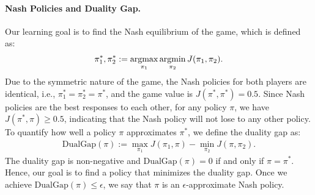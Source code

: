 \paragraph{Nash Policies and Duality Gap.} Our learning goal is to find the Nash equilibrium of the game, which is defined as:
\begin{align*}
\pi_1^*,\pi_2^*:=\mathop{\mathrm{argmax}}_{\pi_1} \mathop{\mathrm{argmin}}_{\pi_2} J(\pi_1,\pi_2).
\end{align*}
Due to the symmetric nature of the game, the Nash policies for both players are identical, i.e., $\pi_1^*=\pi_2^*=\pi^*$, and the game value is $J(\pi^*,\pi^*)=0.5$. Since Nash policies are the best responses to each other, for any policy $\pi$, we have $J(\pi^*,\pi) \ge 0.5$, indicating that the Nash policy will not lose to any other policy. To quantify how well a policy $\pi$ approximates $\pi^*$, we define the duality gap as:
\begin{align*}
\mathrm{DualGap}(\pi):=\max_{\pi_1} J(\pi_1,\pi)-\min_{\pi_2} J(\pi, \pi_2).
\end{align*}
The duality gap is non-negative and $\mathrm{DualGap}(\pi) = 0$ if and only if $\pi = \pi^*$. Hence, our goal is to find a policy that minimizes the duality gap. Once we achieve $\mathrm{DualGap}(\pi) \leq \epsilon$, we say that $\pi$ is an $\epsilon$-approximate Nash policy.

